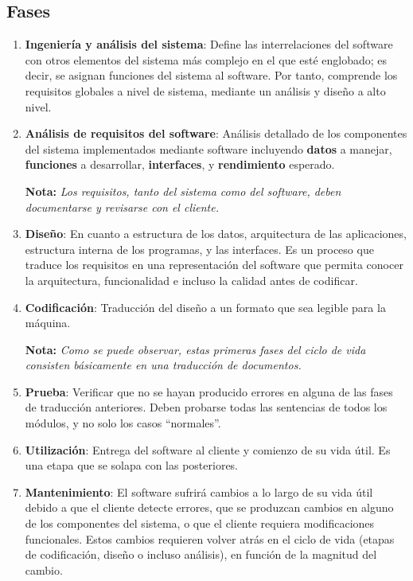 \subsection{Fases}
\begin{enumerate}

   \item \textbf{Ingeniería y análisis del sistema}: Define las interrelaciones del software con otros elementos del sistema más complejo en el que esté englobado; es decir, se asignan funciones del sistema al software. Por tanto, comprende los requisitos globales a nivel de sistema, mediante un análisis y diseño a alto nivel.

   \item \textbf{Análisis de requisitos del software}: Análisis detallado de los componentes del sistema implementados mediante software incluyendo \textbf{datos} a manejar, \textbf{funciones} a desarrollar, \textbf{interfaces}, y \textbf{rendimiento} esperado.
   
   \textbf{Nota:} \textit{Los requisitos, tanto del sistema como del software, deben documentarse y revisarse con el cliente.}

   \item \textbf{Diseño}: En cuanto a estructura de los datos, arquitectura de las aplicaciones, estructura interna de los programas, y las interfaces. Es un proceso que traduce los requisitos en una representación del software que permita conocer la arquitectura, funcionalidad e incluso la calidad antes de codificar.

   \item \textbf{Codificación}: Traducción del diseño a un formato que sea legible para la máquina.
   
   \textbf{Nota:} \textit{Como se puede observar, estas primeras fases del ciclo de vida consisten básicamente en una traducción de documentos.}

   \item \textbf{Prueba}: Verificar que no se hayan producido errores en alguna de las fases de traducción anteriores. Deben probarse todas las sentencias de todos los módulos, y no solo los casos ``normales''.

   \item \textbf{Utilización}: Entrega del software al cliente y comienzo de su vida útil. Es una etapa que se solapa con las posteriores.
   
   \item \textbf{Mantenimiento}: El software sufrirá cambios a lo largo de su vida útil debido a que el cliente detecte errores, que se produzcan cambios en alguno de los componentes del sistema, o que el cliente requiera modificaciones funcionales. Estos cambios requieren volver atrás en el ciclo de vida (etapas de codificación, diseño o incluso análisis), en función de la magnitud del cambio.
   

\end{enumerate}
